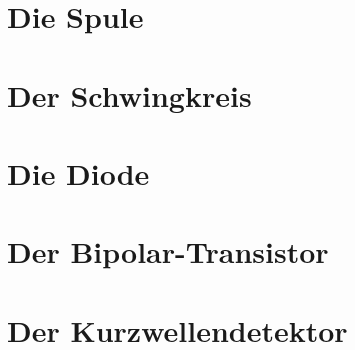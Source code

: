 \documentclass[ngerman,openany]{Script}
\begin{document}


\newpage
\chapter{Die Spule}


\chapter{Der Schwingkreis}


\chapter{Die Diode}


\chapter{Der Bipolar-Transistor}


\chapter{Der Kurzwellendetektor}



\end{document}
